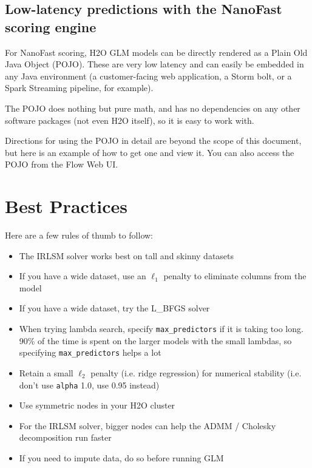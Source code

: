 \subsection{Low-latency predictions with the NanoFast scoring engine}

For NanoFast scoring, H2O GLM models can be directly rendered as a Plain Old Java Object (POJO).  These are very
low latency and can easily be embedded in any Java environment (a customer-facing web application, a Storm bolt,
or a Spark Streaming pipeline, for example).

The POJO does nothing but pure math, and has no dependencies on any other software packages (not even H2O itself),
so it is easy to work with.

Directions for using the POJO in detail are beyond the scope of this document, but here is an example of how to get
one and view it.  You can also access the POJO from the Flow Web UI.

\bigskip
\waterExampleInR




\section{Best Practices}

Here are a few rules of thumb to follow:

\begin{itemize}
\item The IRLSM solver works best on tall and skinny datasets
\item If you have a wide dataset, use an  $\ell_1$ penalty to eliminate columns from the model
\item If you have a wide dataset, try the L\_BFGS solver
\item When trying lambda search, specify \texttt{max\_predictors} if it is taking too long. 90\% of the time is spent on the larger models with the small lambdas, so specifying \texttt{max\_predictors} helps a lot
\item Retain a small  $\ell_2$ penalty (i.e. ridge regression) for numerical stability (i.e. don’t use \texttt{alpha} 1.0, use 0.95 instead)
\item Use symmetric nodes in your H2O cluster
\item For the IRLSM solver, bigger nodes can help the ADMM / Cholesky decomposition run faster
\item If you need to impute data, do so before running GLM
\end{itemize}

